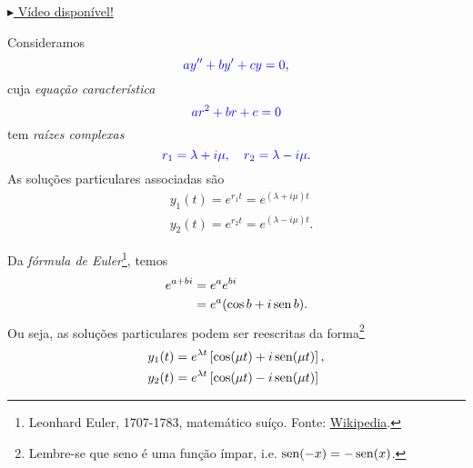 \begin{flushright}
  \href{https://archive.org/details/edo-ordem-2-rc}{$\blacktriangleright$ Vídeo disponível!}
\end{flushright}

Consideramos
\begin{equation}\label{eq:ed2o_hcc_rc}
  {\color{blue}ay'' + by' + cy = 0},
\end{equation}
cuja \emph{equação característica}
\begin{equation}
  {\color{blue}ar^2 + br + c = 0}
\end{equation}
tem \emph{raízes complexas}
\begin{equation}
  {\color{blue}r_1 = \lambda + i\mu,\quad r_2 = \lambda - i\mu}.
\end{equation}
As soluções particulares associadas são
\begin{align}
  &y_1(t) = e^{r_1t} = e^{(\lambda + i\mu)t} \\
  &y_2(t) = e^{r_2t} = e^{(\lambda - i\mu)t}.
\end{align}

Da \emph{fórmula de Euler}\footnote{Leonhard Euler, 1707-1783, matemático suíço. Fonte: \href{https://en.wikipedia.org/wiki/Leonhard_Euler}{Wikipedia}.}, temos
\begin{align}
  e^{a+bi} &= e^ae^{bi}\\
           &= e^a(\cos b + i\operatorname{sen} b).
\end{align}
Ou seja, as soluções particulares podem ser reescritas da forma\footnote{Lembre-se que seno é uma função ímpar, i.e. $\operatorname{sen}(-x) = -\operatorname{sen}(x)$.}
\begin{align}
  &y_1(t) = e^{\lambda t}\left[\cos(\mu t) + i\operatorname{sen}(\mu t)\right], \\
  &y_2(t) = e^{\lambda t}\left[\cos(\mu t) - i\operatorname{sen}(\mu t)\right]
\end{align}

